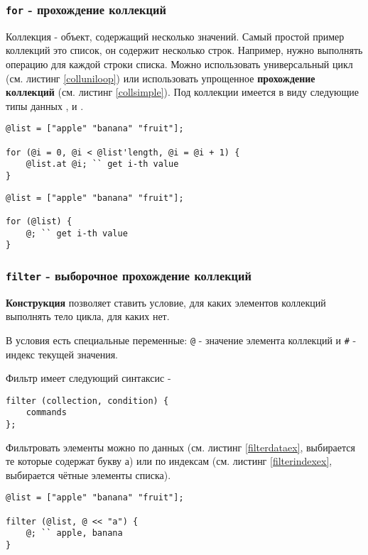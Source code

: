 \documentclass[a4paper, 14pt]{extarticle}
\begin{document}
\subsubsection{\lstinline`for` - прохождение коллекций}

{Коллекция} - объект, содержащий несколько значений. Самый простой пример коллекций это список, он содержит несколько строк. Например, нужно выполнять операцию для каждой строки списка. Можно использовать универсальный цикл (см. листинг \ref{colluniloop}) или использовать упрощенное {\bf прохождение коллекций} (см. листинг \ref{collsimple}). Под коллекции имеется в виду следующие типы данных ,  и .
\begin{lstlisting}[caption=Прохождение коллекций с помощью универсального цикла, label=colluniloop]
@list = ["apple" "banana" "fruit"];

for (@i = 0, @i < @list'length, @i = @i + 1) {
	@list.at @i; `` get i-th value
}
\end{lstlisting}

\begin{lstlisting}[caption=Упрощённое прохождение коллекций, label=collsimple]
@list = ["apple" "banana" "fruit"];

for (@list) {
	@; `` get i-th value
}
\end{lstlisting}

\subsubsection{\lstinline`filter` - выборочное прохождение коллекций}

{\bf Конструкция } позволяет ставить условие, для каких элементов коллекций выполнять тело цикла, для каких нет.

В условия есть специальные переменные: \lstinline|@| - значение элемента коллекций и \lstinline|#| - индекс текущей значения.

Фильтр имеет следующий синтаксис -
\begin{lstlisting}[numbers=none]
filter (collection, condition) {
	commands
};
\end{lstlisting}

Фильтровать элементы можно по данных (см. листинг \ref{filterdataex}, выбирается те которые содержат букву а) или по индексам (см. листинг \ref{filterindexex}, выбирается чётные элементы списка).

\begin{lstlisting}[caption=Фильтрование по данных, label=filterdataex]
@list = ["apple" "banana" "fruit"];

filter (@list, @ << "a") {
	@; `` apple, banana
}
\end{lstlisting}
\end{document}
